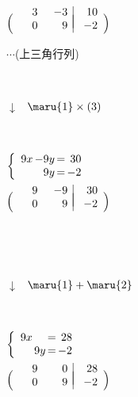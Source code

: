 \documentclass[a4paper,10pt,onecolumn,oneside,notitlepage,final]{jsarticle} %
\begin{document}
\begin{CKdata}
\begin{edaenumerate}
\item\ 
$\left(\begin{array}{rr|r}
\hspace{6mm}&\hspace{6mm}&\hspace{6mm}\\[-7mm]
   3&  -3&  10\\   0&   9&  -2
\end{array}\right)$
\item\ $\cdots$(上三角行列)
\item\ \item\ $\downarrow$ $\begin{array}{l}
\maru{1}\times(3)
\end{array}$\item\ 
\item\ 
$\left\{\begin{array}{r@{\,}r@{\,=\,}r}
  9x& -9y&  30\\    &  9y&  -2
\end{array}\right.$
\item\ 
$\left(\begin{array}{rr|r}
\hspace{6mm}&\hspace{6mm}&\hspace{6mm}\\[-7mm]
   9&  -9&  30\\   0&   9&  -2
\end{array}\right)$
\item\ 
\item\ \item\ $\downarrow$ $\begin{array}{l}
\maru{1}+\maru{2}
\end{array}$\\[-5mm]\item\ 
\item\ 
$\left\{\begin{array}{r@{\,}r@{\,=\,}r}
  9x&    &  28\\    &  9y&  -2
\end{array}\right.$
\item\ 
$\left(\begin{array}{rr|r}
\hspace{6mm}&\hspace{6mm}&\hspace{6mm}\\[-7mm]
   9&   0&  28\\   0&   9&  -2
\end{array}\right)$

\end{edaenumerate}
\end{CKdata}
\end{document}
